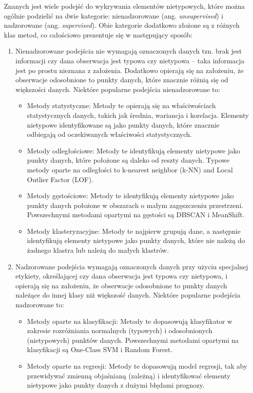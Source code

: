 \documentclass[12pt,a4paper,oneside]{book}
\theoremstyle{definition}
\begin{document}
Znanych jest wiele podejść do wykrywania elementów nietypowych, które można ogólnie podzielić na dwie kategorie: nienadzorowane (ang. \textit{unsupervised}) i nadzorowane (ang. \textit{supervised}). Obie kategorie dodatkowo złożone są z różnych klas metod, co całościowo prezentuje się w następujący sposób:
\begin{enumerate}
\item Nienadzorowane podejścia nie wymagają oznaczonych danych tzn. brak jest informacji czy dana obserwacja jest typowa czy nietypowa -- taka informacja jest po prostu nieznana z założenia. Dodatkowo opierają się na założeniu, że obserwacje odosobnione to punkty danych, które znacznie różnią się od większości danych. Niektóre popularne podejścia nienadzorowane to:
\begin{itemize}
\item Metody statystyczne: Metody te opierają się na właściwościach statystycznych danych, takich jak średnia, wariancja i korelacja. Elementy nietypowe identyfikowane są jako punkty danych, które znacznie odbiegają od oczekiwanych właściwości statystycznych.
\item Metody odległościowe: Metody te identyfikują elementy nietypowe jako punkty danych, które położone są daleko od reszty danych. Typowe metody oparte na odległości to k-nearest neighbor (k-NN) and Local Outlier Factor (LOF).
\item Metody gęstościowe: Metody te identyfikują elementy nietypowe jako punkty danych położone w obszarach o małym zagęszczeniu przestrzeni. Powszechnymi metodami opartymi na gęstości są DBSCAN i MeanShift.
\item Metody klasteryzacyjne: Metody te najpierw grupują dane, a następnie identyfikują elementy nietypowe jako punkty danych, które nie należą do żadnego klastra lub należą do małych klastrów.
\end{itemize}
\item Nadzorowane podejścia wymagają oznaczonych danych przy użyciu specjalnej etykiety, określającej czy dana obserwacja jest typowa czy nietypowa, i opierają się na założeniu, że obserwacje odosobnione to punkty danych należące do innej klasy niż większość danych. Niektóre popularne podejścia nadzorowane to:
\begin{itemize}
\item Metody oparte na klasyfikacji: Metody te dopasowują klasyfikator w zakresie rozróżniania normalnych (typowych) i odosobnionych (nietypowych) punktów danych. Powszechnymi metodami opartymi na klasyfikacji są One-Class SVM i Random Forest.
\item Metody oparte na regresji: Metody te dopasowują model regresji, tak aby przewidywać zmienną objaśnianą (zależną) i identyfikować elementy nietypowe jako punkty danych z dużymi błędami prognozy.
\end{itemize}
\end{enumerate}
\end{document}
